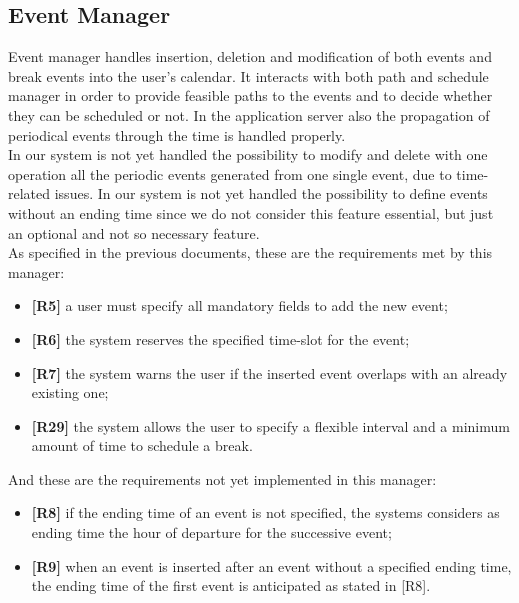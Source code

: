 \subsection{Event Manager}
Event manager handles insertion, deletion and modification of both events and break events into the user's calendar.
It interacts with both path and schedule manager in order to provide feasible paths to the events and to decide whether they can be scheduled or not.
In the application server also the propagation of periodical events through the time is handled properly. \\
In our system is not yet handled the possibility to modify and delete with one operation all the periodic events generated from one single event, due to time-related issues.
In our system is not yet handled the possibility to define events without an ending time since we do not consider this feature essential, but just an optional and not so necessary feature. \\
As specified in the previous documents, these are the requirements met by this manager:
\begin{itemize}
	\item \textbf{[R5]} a user must specify all mandatory fields to add the new event;
	\item \textbf{[R6]} the system reserves the specified time-slot for the event;
	\item \textbf{[R7]} the system warns the user if the inserted event overlaps with an already existing one;
	\item \textbf{[R29]} the system allows the user to specify a flexible interval and a minimum amount of time to schedule a break.
\end{itemize}
And these are the requirements not yet implemented in this manager:
\begin{itemize}
	\item \textbf{[R8]} if the ending time of an event is not specified, the systems considers as ending time the hour of departure for the successive event;
	\item \textbf{[R9]} when an event is inserted after an event without a specified ending time, the ending time  of the first event is anticipated as stated in [R8].
\end{itemize}

